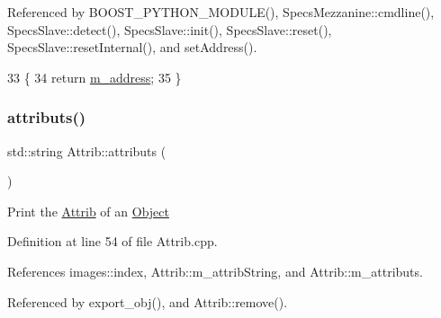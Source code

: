 Referenced by B\+O\+O\+S\+T\+\_\+\+P\+Y\+T\+H\+O\+N\+\_\+\+M\+O\+D\+U\+L\+E(), Specs\+Mezzanine\+::cmdline(), Specs\+Slave\+::detect(), Specs\+Slave\+::init(), Specs\+Slave\+::reset(), Specs\+Slave\+::reset\+Internal(), and set\+Address().


\begin{DoxyCode}
33                                       \{
34     \textcolor{keywordflow}{return} \hyperlink{classSpecsInterface_a4064da5ca6e0a172363967c4acc0b365}{m\_address};
35 \}
\end{DoxyCode}
\mbox{\label{classAttrib_aee7bbf16b144887f196e1341b24f8a26}} 
\subsubsection{\texorpdfstring{attributs()}{attributs()}}
{\footnotesize\ttfamily std\+::string Attrib\+::attributs (\begin{DoxyParamCaption}{ }\end{DoxyParamCaption})\hspace{0.3cm}{\ttfamily [inherited]}}

Print the \hyperlink{classAttrib}{Attrib} of an \hyperlink{classObject}{Object} 

Definition at line 54 of file Attrib.\+cpp.



References images\+::index, Attrib\+::m\+\_\+attrib\+String, and Attrib\+::m\+\_\+attributs.



Referenced by export\+\_\+obj(), and Attrib\+::remove().


